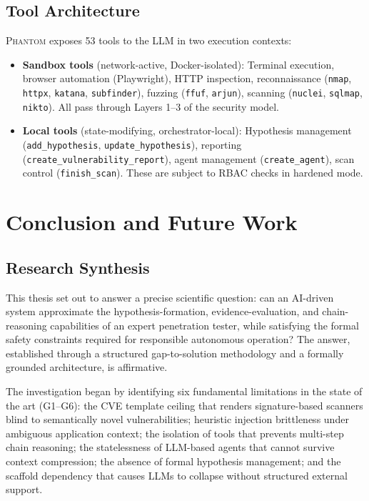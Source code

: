 \documentclass[12pt,a4paper,oneside,openany]{book}
\newcommand{\Phantom}{\textsc{Phantom}}
\newcommand{\code}[1]{\texttt{#1}}
\begin{document}
\section{Tool Architecture}

\Phantom{} exposes 53 tools to the LLM in two execution contexts:

\begin{itemize}
\item \textbf{Sandbox tools} (network-active, Docker-isolated): Terminal execution, browser automation (Playwright), HTTP inspection, reconnaissance (\code{nmap}, \code{httpx}, \code{katana}, \code{subfinder}), fuzzing (\code{ffuf}, \code{arjun}), scanning (\code{nuclei}, \code{sqlmap}, \code{nikto}). All pass through Layers 1--3 of the security model.
\item \textbf{Local tools} (state-modifying, orchestrator-local): Hypothesis management (\code{add\_hypothesis}, \code{update\_hypothesis}), reporting (\code{create\_vulnerability\_report}), agent management (\code{create\_agent}), scan control (\code{finish\_scan}). These are subject to RBAC checks in hardened mode.
\end{itemize}

\chapter{Conclusion and Future Work}

\section{Research Synthesis}

This thesis set out to answer a precise scientific question: can an AI-driven system approximate the hypothesis-formation, evidence-evaluation, and chain-reasoning capabilities of an expert penetration tester, while satisfying the formal safety constraints required for responsible autonomous operation? The answer, established through a structured gap-to-solution methodology and a formally grounded architecture, is affirmative.

The investigation began by identifying six fundamental limitations in the state of the art (G1--G6): the CVE template ceiling that renders signature-based scanners blind to semantically novel vulnerabilities; heuristic injection brittleness under ambiguous application context; the isolation of tools that prevents multi-step chain reasoning; the statelessness of LLM-based agents that cannot survive context compression; the absence of formal hypothesis management; and the scaffold dependency that causes LLMs to collapse without structured external support.
\end{document}
